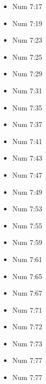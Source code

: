 \documentclass[14pt]{book}
\begin{document}
\begin{multicols}{2}
\begin{itemize}
\item Num 7:17

\item Num 7:19

\item Num 7:23

\item Num 7:25

\item Num 7:29

\item Num 7:31

\item Num 7:35

\item Num 7:37

\item Num 7:41

\item Num 7:43

\item Num 7:47

\item Num 7:49

\item Num 7:53

\item Num 7:55

\item Num 7:59

\item Num 7:61

\item Num 7:65

\item Num 7:67

\item Num 7:71

\item Num 7:72

\item Num 7:73

\item Num 7:77

\item Num 7:77


\end{itemize}
\end{multicols}
\end{document}
